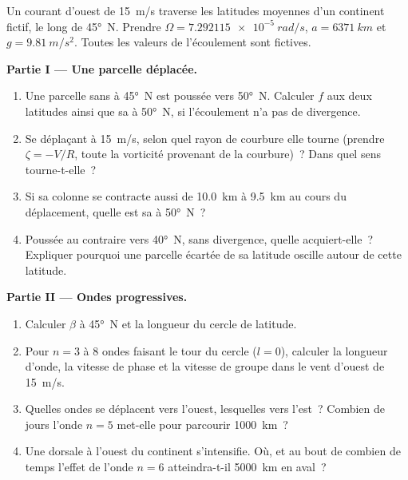 \begin{problem}
\label{pb:b3:atmospheric-dynamics:1}
Un courant d'ouest de \qty{15}{m/s} traverse les latitudes moyennes d'un
continent fictif, le long de \ang{45}~N. Prendre $\Omega =
\qty{7.292115e-5}{rad/s}$, $a = \qty{6371}{km}$ et $g = \qty{9.81}{m/s^2}$.
Toutes les valeurs de l'écoulement sont fictives.

\medskip\noindent\textbf{Partie I --- Une parcelle déplacée.}
\begin{enumerate}
\item Une parcelle sans  à \ang{45}~N est poussée vers
  \ang{50}~N. Calculer $f$ aux deux latitudes ainsi que sa  à
  \ang{50}~N, si l'écoulement n'a pas de divergence.
\item Se déplaçant à \qty{15}{m/s}, selon quel rayon de courbure elle tourne
  (prendre $\zeta = -V/R$, toute la vorticité provenant de la courbure)~? Dans quel sens tourne-t-elle~?
\item Si sa colonne se contracte aussi de \qty{10.0}{km} à \qty{9.5}{km} au
  cours du déplacement, quelle est sa  à \ang{50}~N~?
\item Poussée au contraire vers \ang{40}~N, sans divergence, quelle 
  acquiert-elle~? Expliquer pourquoi une parcelle écartée de sa
  latitude oscille autour de cette latitude.
\end{enumerate}

\medskip\noindent\textbf{Partie II --- Ondes progressives.}
\begin{enumerate}[resume]
\item Calculer $\beta$ à \ang{45}~N et la longueur du cercle de latitude.
\item Pour $n = 3$ à 8 ondes faisant le tour du cercle ($l = 0$), calculer la
  longueur d'onde, la vitesse de phase et la vitesse de groupe dans le vent d'ouest
  de \qty{15}{m/s}.
\item Quelles ondes se déplacent vers l'ouest, lesquelles vers l'est~? Combien de jours
  l'onde $n = 5$ met-elle pour parcourir \qty{1000}{km}~?
\item Une dorsale à l'ouest du continent s'intensifie. Où, et au bout de
  combien de temps l'effet de l'onde $n = 6$ atteindra-t-il \qty{5000}{km}
  en aval~?
\end{enumerate}


\end{problem}
